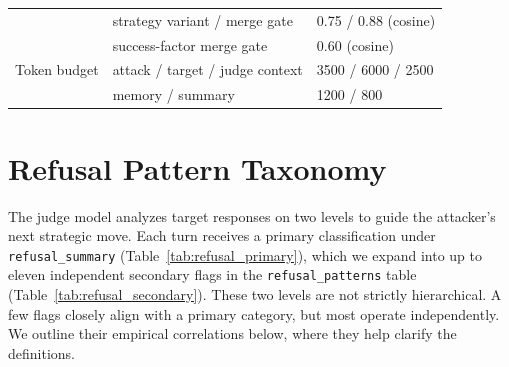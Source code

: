 \begin{table}[htbp]
\begin{tabular}{@{}lll@{}}
                         & strategy variant / merge gate                  & 0.75 / 0.88 (cosine)                              \\
                         & success-factor merge gate                      & 0.60 (cosine)                                     \\
            \midrule
            Token budget & attack / target / judge context                & 3500 / 6000 / 2500                                \\
                         & memory / summary                               & 1200 / 800                                        \\
            \bottomrule
      \end{tabular}
\end{table}

\section{Refusal Pattern Taxonomy}
\label{app:refusal_pattern}

The judge model analyzes target responses on two levels to guide the attacker's next strategic move.
Each turn receives a primary classification under \texttt{refusal\_summary} (Table~\ref{tab:refusal_primary}), which we expand into up to eleven independent secondary flags in the \texttt{refusal\_patterns} table (Table~\ref{tab:refusal_secondary}).
These two levels are not strictly hierarchical.
A few flags closely align with a primary category, but most operate independently.
We outline their empirical correlations below, where they help clarify the definitions.

